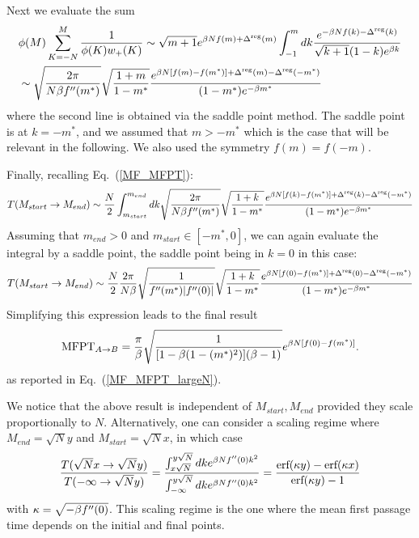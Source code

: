 \documentclass[aps,twocolumn,floats,pre,amsmath,superscriptaddress]{revtex4}
\newcommand{\beq}{\begin{equation}}
\newcommand{\eeq}{\end{equation}}
\let\D=\Delta \let\L=\Lambda \let\X=\Xi \let\P=\Pi
\def\to{\rightarrow} \def\la{\langle} \def\ra{\rangle}
\newcommand{\<}{\langle}
\renewcommand{\>}{\rangle}
\renewcommand{\P}{ \mathbb{P}}
\begin{document}
\begin{widetext}

Next we evaluate the sum
\beq\begin{split}
&\phi(M)  \sum_{K=-N}^M \frac{1}{\phi(K) w_+(K)} 
\sim  \sqrt{m+1} e^{\b N f(m) + \D^{\rm reg}(m) }     \int_{-1}^m dk  \frac{e^{-\b N f(k) - \D^{\rm reg}(k) }}
{\sqrt{k+1} (1-k)e^{\b k}} \\
&\sim \sqrt{ \frac{2 \pi}{N \b f''(m^*)} }  \sqrt{ \frac{1+m}{1-m^*} }
\frac{e^{\b N [f(m)-f(m^*)] + \D^{\rm reg}(m)- \D^{\rm reg}(-m^*)}}
{(1-m^*)e^{-\b m^*}}
\end{split}\eeq
where the second line is obtained via the saddle point method. The saddle point is at $k=-m^*$,
and we assumed that $m > -m^*$ which
is the case that will be relevant in the following. We also used the symmetry $f(m)=f(-m)$.

Finally, recalling Eq.~(\ref{MF_MFPT}):
\beq
T(M_{start} \to M_{end}) \sim \frac{N}2 \int_{m_{start}}^{m_{end}} dk
  \sqrt{ \frac{2 \pi}{N \b f''(m^*)} }  \sqrt{ \frac{1+k}{1-m^*} }
\frac{e^{\b N [f(k)-f(m^*)] + \D^{\rm reg}(k)- \D^{\rm reg}(-m^*)}}
{(1-m^*)e^{-\b m^*}}
\eeq
Assuming that $m_{end}>0$ and $m_{start} \in [-m^*,0]$, we can again evaluate the integral by a saddle point,
the saddle point being in $k=0$ in this case:
\beq
T(M_{start} \to M_{end}) \sim \frac{N}2 
\frac{2 \pi}{N \b} \sqrt{ \frac{1}{ f''(m^*) | f''(0)|} }  \sqrt{ \frac{1+k}{1-m^*} }
\frac{e^{\b N [f(0)-f(m^*)] + \D^{\rm reg}(0)- \D^{\rm reg}(-m^*)}}
{(1-m^*)e^{-\b m^*}}
\eeq
Simplifying this expression leads to the final result 
\beq%
\text{MFPT}_{A\to B} =
\frac{\pi}{\b} \sqrt{\frac{1}{[1-\b(1-(m^*)^2)](\b-1)}}e^{\b N [f(0) -
  f(m^*) ]}.
\eeq
as reported in Eq.~(\ref{MF_MFPT_largeN}).

We notice that the above result is independent of $M_{start}, M_{end}$ provided they scale proportionally
to $N$. Alternatively,
one can consider a scaling regime where $M_{end} = \sqrt{N} y$ and $M_{start} = \sqrt{N} x$,
in which case
\beq\label{MF_MFPT_scaling}
\frac{T(\sqrt{N} x \to \sqrt{N} y)}{T(-\io \to \sqrt{N} y)} = 
\frac{\int_{x \sqrt{N}}^{y \sqrt{N}} dk e^{\b N f''(0) k^2}}
{\int_{-\io}^{y \sqrt{N}} dk e^{\b N f''(0) k^2}}
= \frac{\text{erf}(\k y) - \text{erf}(\k x)}{\text{erf}(\k y) -1}
\eeq
with $\kappa = \sqrt{-\beta f''(0)}$. This scaling regime is the one where the mean first passage time
depends on the initial and final points.

\end{widetext}
\end{document}
